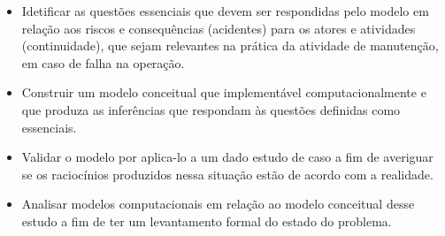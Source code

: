 \begin{itemize}
    \item Idetificar as questões essenciais que devem ser respondidas pelo modelo em relação aos riscos e consequências (acidentes) para os atores e atividades (continuidade), que sejam relevantes na prática da atividade de manutenção, em caso de falha na operação. 
    \item Construir um modelo conceitual que implementável computacionalmente e que produza as inferências que respondam às questões definidas como essenciais.
    \item Validar o modelo por aplica-lo a um dado estudo de caso a fim de averiguar se os raciocínios produzidos nessa situação estão de acordo com a realidade.  
    \item Analisar modelos computacionais em relação ao modelo conceitual desse estudo a fim de ter um levantamento formal do estado do problema.
\end{itemize}
